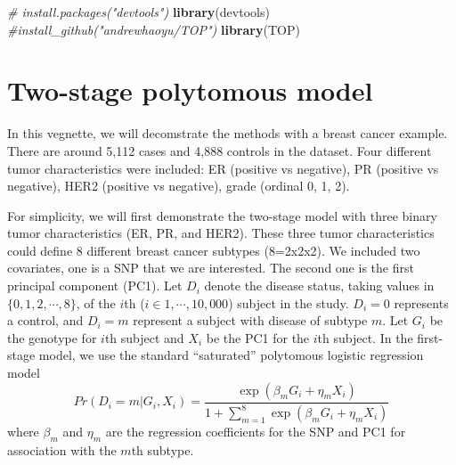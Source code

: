 \documentclass[11pt,]{article}
\newenvironment{Shaded}{\begin{snugshade}}{\end{snugshade}}
\newcommand{\KeywordTok}[1]{\textcolor[rgb]{0.13,0.29,0.53}{\textbf{#1}}}
\newcommand{\CommentTok}[1]{\textcolor[rgb]{0.56,0.35,0.01}{\textit{#1}}}
\newcommand{\NormalTok}[1]{#1}
\begin{document}
\begin{Shaded}
\begin{Highlighting}[]
\CommentTok{# install.packages("devtools")}
\KeywordTok{library}\NormalTok{(devtools)  }
\CommentTok{#install_github("andrewhaoyu/TOP")}
\KeywordTok{library}\NormalTok{(TOP)}
\end{Highlighting}
\end{Shaded}

\section{Two-stage polytomous model}\label{two-stage-polytomous-model}

In this vegnette, we will decomstrate the methods with a breast cancer
example. There are around 5,112 cases and 4,888 controls in the dataset.
Four different tumor characteristics were included: ER (positive vs
negative), PR (positive vs negative), HER2 (positive vs negative), grade
(ordinal 0, 1, 2).

For simplicity, we will first demonstrate the two-stage model with three
binary tumor characteristics (ER, PR, and HER2). These three tumor
characteristics could define 8 different breast cancer subtypes
(8=2x2x2). We included two covariates, one is a SNP that we are
interested. The second one is the first principal component (PC1). Let
\(D_{i}\) denote the disease status, taking values in
\(\{0,1,2,\cdots,8\}\), of the \(i\)th (\(i \in 1, \cdots, 10,000\))
subject in the study. \(D_{i}=0\) represents a control, and \(D_{i}=m\)
represent a subject with disease of subtype \(m\). Let \(G_i\) be the
genotype for \(i\)th subject and \(X_i\) be the PC1 for the \(i\)th
subject. In the first-stage model, we use the standard ``saturated''
polytomous logistic regression model
\[ Pr(D_{i}=m|G_i,X_{i})=\frac{\exp(\beta_m G_i+\eta_m X_i)}{1+\sum_{m=1}^{8}\exp(\beta_m G_i+\eta_{m}X_{i})}\]
where \(\beta_{m}\) and \(\eta_{m}\) are the regression coefficients for
the SNP and PC1 for association with the \(m\)th subtype.
\end{document}
